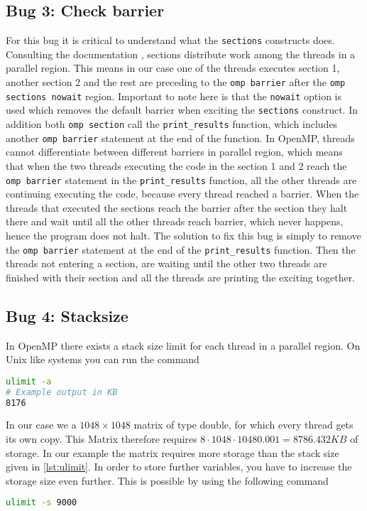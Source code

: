 \subsection{Bug 3: Check barrier}
For this bug it is critical to understand what the \texttt{sections} constructs does. Consulting the documentation \cite{noauthor_ibm_2024}, sections distribute work among the threads in a parallel region.
This means in our case one of the threads executes section 1, another section 2 and the rest are preceding to the \texttt{omp barrier} after the \texttt{omp sections nowait} region. Important to note here is that the \texttt{nowait} option is used which removes the default barrier when exciting the \texttt{sections} construct. \newline
In addition both \texttt{omp section} call the \texttt{print\_results} function, which includes another \texttt{omp barrier} statement at the end of the function.\newline
In OpenMP, threads cannot differentiate between different barriers in parallel region, which means that when the two threads executing the code in the section 1 and 2 reach the \texttt{omp barrier} statement in the \texttt{print\_results} function, all the other threads are continuing executing the code, because every thread reached a barrier. When the threads that executed the sections reach the barrier after the section they halt there and wait until all the other threads reach barrier, which never happens, hence the program does not halt.\newline
\newline
The solution to fix this bug is simply to remove the \texttt{omp barrier} statement at the end of the \texttt{print\_results} function. Then the threads not entering a section, are waiting until the other two threads are finished with their section and all the threads are printing the exciting together.
\subsection{Bug 4: Stacksize}
In OpenMP there exists a stack size limit for each thread in a parallel region. 
On Unix like systems you can run the command
\begin{lstlisting}[language=bash, caption=Find current stacksize on Unix-like system, label=lst:ulimit]
ulimit -a
# Example output in KB
8176
\end{lstlisting}
In our case we a $1048 \times 1048$ matrix of type double, for which every thread gets its own copy.
This Matrix therefore requires $ 8 \cdot 1048 \cdot 1048 0.001 = 8786.432 KB$ of storage. In our example the matrix requires more storage than the stack size given in \ref{lst:ulimit}. In order to store further variables, you have to increase the storage size even further. This is possible by using the following command
\begin{lstlisting}[language=bash, caption=Setting new stacksize on Unix-like system]
ulimit -s 9000
\end{lstlisting}

